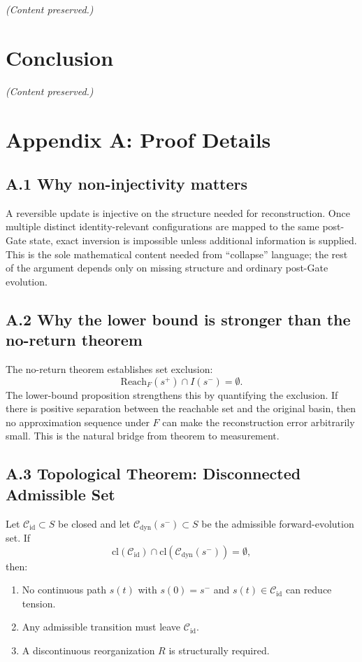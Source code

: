 \documentclass[12pt]{article}
\begin{document}
\textit{(Content preserved.)}

\section{Conclusion}

\textit{(Content preserved.)}

\appendix

\section{Appendix A: Proof Details}

\subsection{A.1 Why non-injectivity matters}

A reversible update is injective on the structure needed for reconstruction. Once multiple distinct
identity-relevant configurations are mapped to the same post-Gate state, exact inversion is impossible
unless additional information is supplied. This is the sole mathematical content needed from
“collapse” language; the rest of the argument depends only on missing structure and ordinary
post-Gate evolution.

\subsection{A.2 Why the lower bound is stronger than the no-return theorem}

The no-return theorem establishes set exclusion:
\[
\text{Reach}_F(s^+) \cap I(s^-) = \emptyset.
\]
The lower-bound proposition strengthens this by quantifying the exclusion. If there is positive
separation between the reachable set and the original basin, then no approximation sequence under
$F$ can make the reconstruction error arbitrarily small. This is the natural bridge from theorem to
measurement.

\subsection{A.3 Topological Theorem: Disconnected Admissible Set}

Let $\mathcal{C}_{\mathrm{id}} \subset S$ be closed and let $\mathcal{C}_{\mathrm{dyn}}(s^-) \subset S$ be the admissible
forward-evolution set. If
\[
\mathrm{cl}(\mathcal{C}_{\mathrm{id}}) \cap \mathrm{cl}(\mathcal{C}_{\mathrm{dyn}}(s^-)) = \emptyset,
\]
then:
\begin{enumerate}
\item No continuous path $s(t)$ with $s(0)=s^-$ and $s(t)\in\mathcal{C}_{\mathrm{id}}$ can reduce tension.
\item Any admissible transition must leave $\mathcal{C}_{\mathrm{id}}$.
\item A discontinuous reorganization $R$ is structurally required.
\end{enumerate}
\end{document}
